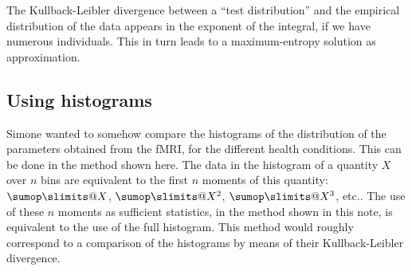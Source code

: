 \documentclass[\ifafour a4paper,12pt,\else a5paper,10pt,\fi%
onecolumn,oneside,article,%
british%
]{memoir}
\makeatletter
\newif\ifpublic
\theoremstyle{remark}
\theoremstyle{innote}
\def\sum{\DOTSI\sumop\slimits@}
\newcommand*{\amp}{\&}
\newenvironment{acknowledgements}{\section*{Thanks}\addcontentsline{toc}{section}{Thanks}}{\par}
\newcommand*\autanet{\texttt{[image: autanet.pdf]}}
\newcommand*{\pf}{\mathrm{p}}%
\renewcommand*{\|}{\mathpunct{|}}
\newcommand*{\etc}{{etc.}}
\newcommand*{\yx}{x}
\newcommand*{\yxx}{\bm{\yx}}
\newcommand*{\data}{\text{data}}
\theoremstyle{plain}
\makeatother
\begin{document}
The Kullback-Leibler divergence between a \enquote{test distribution} and
the empirical distribution of the data  appears in the exponent of the
integral, if we have numerous individuals. This in turn leads to a
maximum-entropy solution as approximation.


\subsection{Using histograms}
\label{sec:histograms}

Simone wanted to somehow compare the histograms of the distribution of the
parameters obtained from the fMRI, for the different health conditions.
This can be done in the method shown here. The data in the histogram of a
quantity $X$ over $n$ bins are equivalent to the first $n$ moments of this
quantity: $\sum X$, $\sum X^2$, $\sum X^3$, \etc. The use of these $n$
moments as sufficient statistics, in the method shown in this note, is
equivalent to the use of the full histogram. This method would roughly
correspond to a comparison of the histograms by means of their
Kullback-Leibler divergence.


\ifpublic
\begin{acknowledgements}
  PGLPM thanks Mari \amp\ Miri for continuous encouragement and affection,
   Buster Keaton and Saitama for filling life with awe and
  inspiration, and  the developers and maintainers of \LaTeX, Emacs, AUC\TeX,
  Open Science Framework, biorXiv, PhilSci, Hal archives, Python, Inkscape,
  Sci-Hub for making a free and unfiltered scientific exchange possible.
\end{acknowledgements}
\fi




\printbibliography[prenote=prenote%
]
\end{document}

